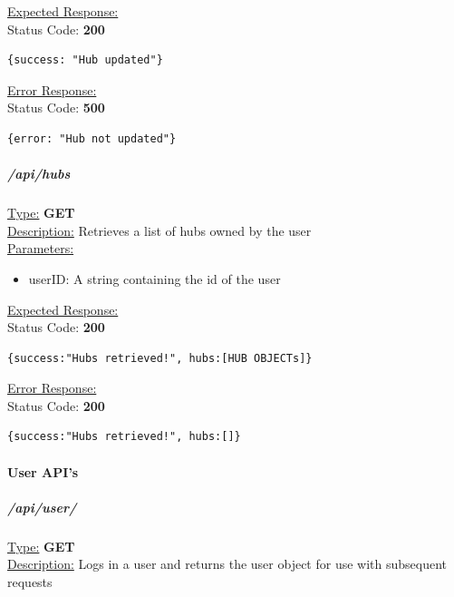 \documentclass[preprint,12pt,3p]{elsarticle}
\newcommand{\forceindent}{\leavevmode{\parindent=1em\indent}}
\begin{document}
\underline{Expected Response:}\\[5pt]
\forceindent Status Code: \textbf{200} \\
\begin{verbatim}
{success: "Hub updated"}
\end{verbatim}

\underline{Error Response:}\\[5pt]
\forceindent Status Code: \textbf{500} \\
\begin{verbatim}
{error: "Hub not updated"}
\end{verbatim}

\subparagraph*{/api/hubs}
\underline{Type:} \textbf{GET}\\

\underline{Description:} Retrieves a list of hubs owned by the user\\

\underline{Parameters:}
\begin{itemize}
\item userID: A string containing the id of the user
\end{itemize}
\underline{Expected Response:}\\[5pt]
\forceindent Status Code: \textbf{200} \\
\begin{verbatim}
{success:"Hubs retrieved!", hubs:[HUB OBJECTs]}
\end{verbatim}
\underline{Error Response:}\\[5pt]
\forceindent Status Code: \textbf{200} \\
\begin{verbatim}
{success:"Hubs retrieved!", hubs:[]}
\end{verbatim}


\paragraph{User API's}

\subparagraph*{/api/user/}
\underline{Type:} \textbf{GET}\\

\underline{Description:} Logs in a user and returns the user object for use with subsequent requests\\
\end{document}
